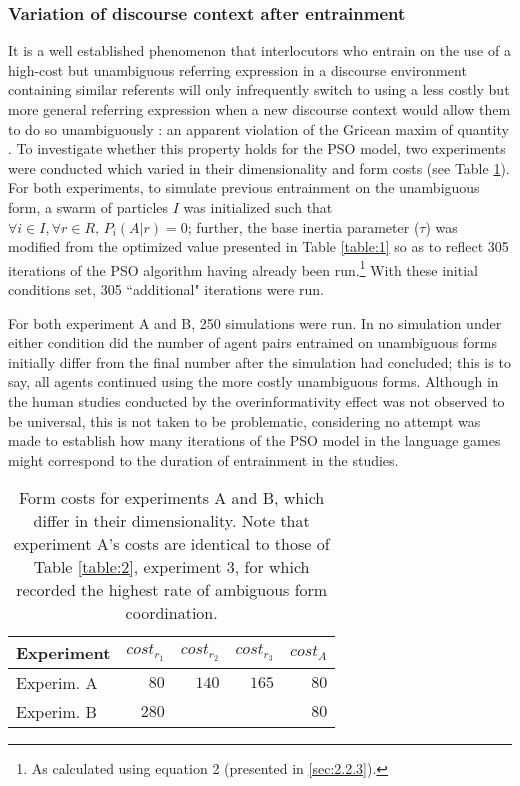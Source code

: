 \documentclass[a4paper,11pt]{article}
\begin{document}
\subsubsection{Variation of discourse context after entrainment}
It is a well established phenomenon that interlocutors who entrain on the use of a high-cost but unambiguous referring expression in a discourse environment containing similar referents will only infrequently switch to using a less costly but more general referring expression when a new discourse context would allow them to do so unambiguously \cite{brennan1996}: an apparent violation of the Gricean maxim of quantity \cite{grice1975}. To investigate whether this property holds for the PSO model, two experiments were conducted which varied in their dimensionality and form costs (see Table \ref{table:4}). For both experiments, to simulate previous entrainment on the unambiguous form, a swarm of particles $I$ was initialized such that $\forall i \in I, \forall r \in R,\, P_i(A|r) = 0$; further, the base inertia parameter ($\tau$) was modified from the optimized value presented in Table \ref{table:1} so as to reflect 305 iterations of the PSO algorithm having already been run.\footnote{As calculated using equation 2 (presented in \ref{sec:2.2.3}).} With these initial conditions set, 305 ``additional" iterations were run.

For both experiment A and B, 250 simulations were run. In no simulation under either condition did the number of agent pairs entrained on unambiguous forms initially differ from the final number after the simulation had concluded; this is to say, all agents continued using the more costly unambiguous forms. Although in the human studies conducted by \citeauthor{brennan1996} the overinformativity effect was not observed to be universal, this is not taken to be problematic, considering no attempt was made to establish how many iterations of the PSO model in the \citeauthor{rohde2012} language games might correspond to the duration of entrainment in the \citeauthor{brennan1996} studies. 

\begin{table}
\begin{center}
    \begin{tabular}{ l r r r r }
    Experiment & $cost_{r_1}$ & $cost_{r_2}$ & $cost_{r_3}$ & $cost_A$\\ \hline
    Experim. A & $80$  & $140$ & $165$ & $80$ \\ \hline
    Experim. B & $280$ &       &       & $80$ \\ \hline
    \end{tabular}
    \caption{Form costs for experiments A and B, which differ in their dimensionality. Note that experiment A's costs are identical to those of Table \ref{table:2}, experiment 3, for which \citeauthor{rohde2012} recorded the highest rate of ambiguous form coordination.}
    \label{table:4}
\end{center}
\end{table}
\end{document}
